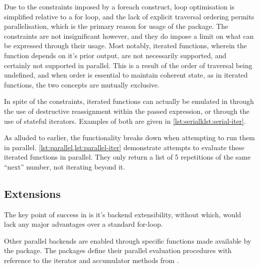 Due to the constraints imposed by a foreach construct, loop optimisation
is simplified relative to a for loop, and the lack of explicit traversal
ordering permits parallelisation, which is the primary reason for usage
of the  package. The constraints are not insignificant
however, and they do impose a limit on what can be expressed through
their usage. Most notably, iterated functions, wherein the function
depends on it's prior output, are not necessarily supported, and
certainly not supported in parallel. This is a result of the order of
traversal being undefined, and when order is essential to maintain
coherent state, as in iterated functions, the two concepts are mutually
exclusive.

In spite of the constraints, iterated functions can actually be emulated
in  through the use of destructive reassignment within the passed
expression, or through the use of stateful iterators. Examples of both
are given in \cref{lst:serialklst:serial-iter}.



As alluded to earlier, the functionality breaks down when attempting to
run them in parallel. \cref{lst:parallel,lst:parallel-iter}
demonstrate attempts to evaluate these iterated functions in parallel.
They only return a list of 5 repetitions of the same ``next'' number,
not iterating beyond it.



\subsection{Extensions}\label{subsec:foreach-extensions}

The key point of success in  is it's backend extensibility,
without which,  would lack any major advantages over a standard
for-loop.

Other parallel backends are enabled through specific functions made
available by the  package. The packages define their parallel
evaluation procedures with reference to the iterator and accumulator
methods from .

